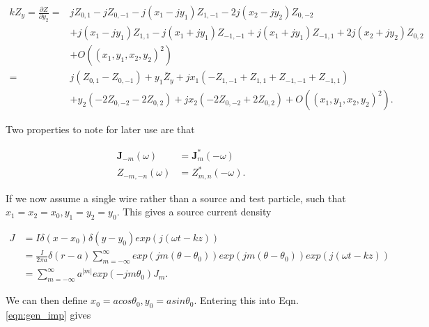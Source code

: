 \begin{align}
kZ_{y} =\frac{\partial Z}{\partial y_{2}} = & jZ_{0,1} - jZ_{0,-1} - j\left( x_{1} - jy_{1} \right) Z_{1,-1} - 2j\left( x_{2} - jy_{2} \right) Z_{0,-2} \nonumber \\
						&+ j\left( x_{1} - jy_{1} \right) Z_{1,1} - j\left( x_{1} + jy_{1} \right) Z_{-1,-1} + j\left( x_{1} + jy_{1} \right) Z_{-1,1} + 2j\left( x_{2} + jy_{2} \right) Z_{0,2} \nonumber \\
						& + O\left( \left( x_{1},y_{1},x_{2},y_{2} \right)^{2} \right) \nonumber \\
						= & j\left(Z_{0,1} - Z_{0,-1} \right)+ y_{1}\bar{Z}_{y} + jx_{1} \left( -Z_{1,-1} + Z_{1,1} + Z_{-1,-1} + Z_{-1,1} \right) \nonumber \\
						& + y_{2}\left(- 2Z_{0,-2} - 2Z_{0,2}  \right) + jx_{2}\left( -2Z_{0,-2} + 2Z_{0,2}  \right) +  O\left( \left( x_{1},y_{1},x_{2},y_{2} \right)^{2} \right).
\end{align}

Two properties to note for later use are that

\begin{align}
\textbf{J}_{-m} \left( \omega \right) & = \textbf{J}_{m}^{*} \left( -\omega \right) \\
Z_{-m,-n} \left( \omega \right) & = Z_{m,n}^{*} \left( -\omega \right).
\end{align}

If we now assume a single wire rather than a source and test particle, such that $x_{1}=x_{2}=x_{0}, y_{1}=y_{2}=y_{0}$. This gives a source current density

\begin{align}
J & = I \delta \left( x-x_{0} \right)\delta \left( y-y_{0} \right) exp\left( j \left(\omega t -kz \right)\right) \nonumber \\
  & = \frac{I}{2\pi a} \delta \left( r-a \right)\displaystyle\sum\limits_{m=-\infty}^{\infty} exp\left( jm \left( \theta -\theta_{0} \right) \right) exp\left( jm \left( \theta -\theta_{0} \right) \right) exp\left( j \left( \omega t - kz \right) \right) \nonumber \\
  & = \displaystyle\sum\limits_{m=-\infty}^{\infty} a^{|m|}exp\left( -jm\theta_{0} \right)J_{m}.
\end{align}

We can then define $x_{0}=acos\theta_{0}, y_{0}=asin\theta_{0}$. Entering this into Eqn. \ref{eqn:gen_imp} gives

